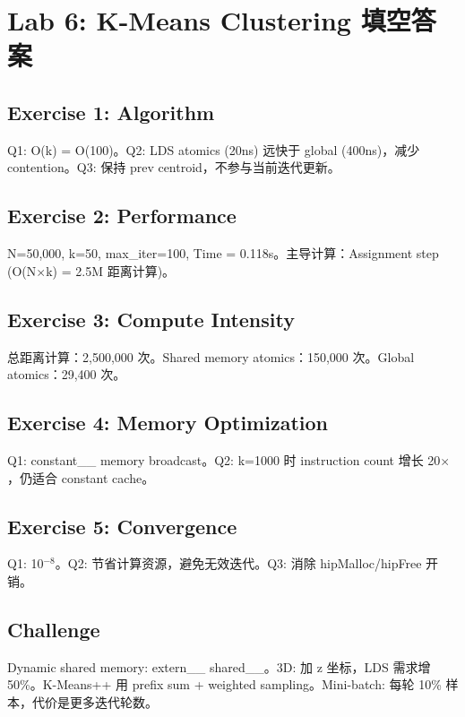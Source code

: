 \documentclass[a4paper]{article}
\begin{document}
\newpage
\section{Lab 6: K-Means Clustering 填空答案}

\subsection*{Exercise 1: Algorithm}
Q1: O(k) = O(100)。Q2: LDS atomics (20ns) 远快于 global (400ns)，减少 contention。Q3: 保持 prev centroid，不参与当前迭代更新。

\subsection*{Exercise 2: Performance}
N=50,000, k=50, max\_iter=100, Time = 0.118s。主导计算：Assignment step (O(N$\times$k) = 2.5M 距离计算)。

\subsection*{Exercise 3: Compute Intensity}
总距离计算：2,500,000 次。Shared memory atomics：150,000 次。Global atomics：29,400 次。

\subsection*{Exercise 4: Memory Optimization}
Q1: constant\_\_ memory broadcast。Q2: k=1000 时 instruction count 增长 20$\times$，仍适合 constant cache。

\subsection*{Exercise 5: Convergence}
Q1: 10$^{-8}$。Q2: 节省计算资源，避免无效迭代。Q3: 消除 hipMalloc/hipFree 开销。

\subsection*{Challenge}
Dynamic shared memory: extern\_\_ shared\_\_。3D: 加 z 坐标，LDS 需求增 50\%。K-Means++ 用 prefix sum + weighted sampling。Mini-batch: 每轮 10\% 样本，代价是更多迭代轮数。
\end{document}
